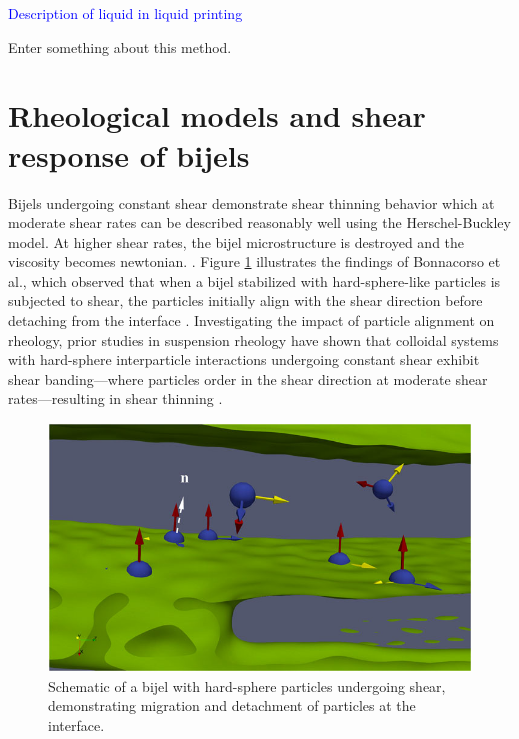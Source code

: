 \textcolor{blue}{Description of liquid in liquid printing}

Enter something about this method. \cite{amirfattahi_fabrication_2024}

\section{Rheological models and shear response of bijels}

Bijels undergoing constant shear demonstrate shear thinning behavior which at moderate shear rates can be described reasonably well using the Herschel-Buckley
model. \cite{macmillan_rheological_2019, wang_morphology_2023} At higher shear rates, the bijel microstructure is destroyed and the viscosity becomes newtonian. 
\cite{cai_bijels_2017,bonaccorso_shear_2020}. Figure \ref{fig:bijel_under_shear} illustrates the findings of Bonnacorso et al., which observed that when a bijel 
stabilized with hard-sphere-like particles is subjected to shear, the particles initially align with the shear direction before detaching from the interface 
\cite{bonaccorso_shear_2020}. Investigating the impact of particle alignment on rheology, prior studies in suspension rheology have shown that colloidal systems 
with hard-sphere interparticle interactions undergoing constant shear exhibit shear banding—where particles order in the shear direction at moderate shear rates—resulting 
in shear thinning \cite{vermant_flow-induced_2005, brader_nonlinear_2010}. 

\begin{figure}
    \centering
    \includegraphics[scale = 2]{figures/literature_review/bijel_under_shear.jpeg}
    \caption{Schematic of a bijel with hard-sphere particles undergoing shear, demonstrating migration and detachment of particles at the interface. 
    \cite{bonaccorso_shear_2020}}
    \label{fig:bijel_under_shear}
\end{figure} 

